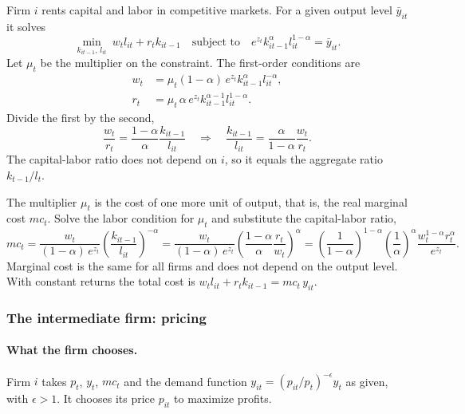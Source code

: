 \documentclass[11pt]{article}
\begin{document}
Firm $i$ rents capital and labor in competitive markets. For a given output level $\bar y_{it}$ it solves
\begin{equation*}
\min_{k_{it-1},\, l_{it}} \ w_t l_{it} + r_t k_{it-1}
\quad \text{subject to} \quad e^{z_t} k_{it-1}^{\alpha} l_{it}^{1-\alpha} = \bar y_{it} .
\end{equation*}
Let $\mu_t$ be the multiplier on the constraint. The first-order conditions are
\begin{align*}
w_t &= \mu_t (1-\alpha)\, e^{z_t} k_{it-1}^{\alpha} l_{it}^{-\alpha}, \\
r_t &= \mu_t\, \alpha\, e^{z_t} k_{it-1}^{\alpha-1} l_{it}^{1-\alpha} .
\end{align*}
Divide the first by the second,
\begin{equation*}
\frac{w_t}{r_t} = \frac{1-\alpha}{\alpha} \frac{k_{it-1}}{l_{it}}
\quad \Longrightarrow \quad
\frac{k_{it-1}}{l_{it}} = \frac{\alpha}{1-\alpha} \frac{w_t}{r_t} .
\end{equation*}
The capital-labor ratio does not depend on $i$, so it equals the aggregate ratio $k_{t-1}/l_t$.

The multiplier $\mu_t$ is the cost of one more unit of output, that is, the real marginal cost $mc_t$. Solve the labor condition for $\mu_t$ and substitute the capital-labor ratio,
\begin{equation*}
mc_t = \frac{w_t}{(1-\alpha)\, e^{z_t}} \left( \frac{k_{it-1}}{l_{it}} \right)^{-\alpha}
= \frac{w_t}{(1-\alpha)\, e^{z_t}} \left( \frac{1-\alpha}{\alpha} \frac{r_t}{w_t} \right)^{\alpha}
= \left( \frac{1}{1-\alpha} \right)^{1-\alpha} \left( \frac{1}{\alpha} \right)^{\alpha} \frac{w_t^{1-\alpha} r_t^{\alpha}}{e^{z_t}} .
\end{equation*}
Marginal cost is the same for all firms and does not depend on the output level. With constant returns the total cost is $w_t l_{it} + r_t k_{it-1} = mc_t\, y_{it}$.

\subsubsection{The intermediate firm: pricing}

\paragraph{What the firm chooses.} Firm $i$ takes $p_t$, $y_t$, $mc_t$ and the demand function $y_{it} = (p_{it}/p_t)^{-\epsilon} y_t$ as given, with $\epsilon > 1$. It chooses its price $p_{it}$ to maximize profits.
\end{document}
